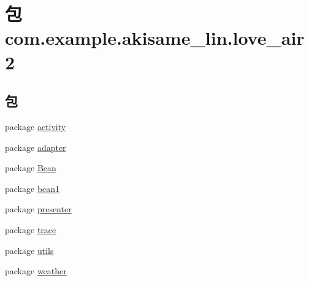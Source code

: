 \hypertarget{namespacecom_1_1example_1_1akisame__lin_1_1love__air2}{}\section{包 com.\+example.\+akisame\+\_\+lin.\+love\+\_\+air2}
\label{namespacecom_1_1example_1_1akisame__lin_1_1love__air2}
\subsection*{包}
\begin{DoxyCompactItemize}
\item 
package \mbox{\hyperlink{namespacecom_1_1example_1_1akisame__lin_1_1love__air2_1_1activity}{activity}}
\item 
package \mbox{\hyperlink{namespacecom_1_1example_1_1akisame__lin_1_1love__air2_1_1adapter}{adapter}}
\item 
package \mbox{\hyperlink{namespacecom_1_1example_1_1akisame__lin_1_1love__air2_1_1_bean}{Bean}}
\item 
package \mbox{\hyperlink{namespacecom_1_1example_1_1akisame__lin_1_1love__air2_1_1bean1}{bean1}}
\item 
package \mbox{\hyperlink{namespacecom_1_1example_1_1akisame__lin_1_1love__air2_1_1presenter}{presenter}}
\item 
package \mbox{\hyperlink{namespacecom_1_1example_1_1akisame__lin_1_1love__air2_1_1trace}{trace}}
\item 
package \mbox{\hyperlink{namespacecom_1_1example_1_1akisame__lin_1_1love__air2_1_1utils}{utils}}
\item 
package \mbox{\hyperlink{namespacecom_1_1example_1_1akisame__lin_1_1love__air2_1_1weather}{weather}}
\end{DoxyCompactItemize}
